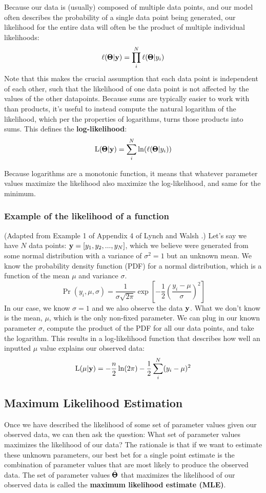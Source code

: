 \documentclass[12pt]{article}
\begin{document}
Because our data is (usually) composed of multiple data points, and our model often describes the probability of a single data point being generated, our likelihood for the entire data will often be the product of multiple individual likelihoods:
$$ \ell(\pmb{\Theta} | \mathbf{y}) = \prod_i^{N} \ell(\pmb{\Theta} | y_i) $$
Note that this makes the crucial assumption that each data point is independent of each other, such that the likelihood of one data point is not affected by the values of the other datapoints.
Because sums are typically easier to work with than products, it's useful to instead compute the natural logarithm of the likelihood, which per the properties of logarithms, turns those products into sums.
This defines the \textbf{log-likelihood}:
$$ \mathrm{L}(\pmb{\Theta} | \mathbf{y}) = \sum_i^{N} \ln( \ell(\pmb{\Theta} | y_i) ) $$

Because logarithms are a monotonic function, it means that whatever parameter values maximize the likelihood also maximize the log-likelihood, and same for the minimum.

\subsubsection{Example of the likelihood of a function}
(Adapted from Example 1 of Appendix 4 of Lynch and Walsh \citep{lynch1998book}.)
Let's say we have $N$ data points: $\mathbf{y} = [y_1,y_2, ..., y_N]$, which we believe were generated from some normal distribution with a variance of $\sigma^2 = 1$ but an unknown mean.
We know the probability density function (PDF) for a normal distribution, which is a function of the mean $\mu$ and variance $\sigma$.
$$
\Pr(y_i, \mu, \sigma) = 
\frac{1}{\sigma \sqrt{2 \pi}}
\exp[- \frac{1}{2} (
    \frac{y_i - \mu}{\sigma}
    )^2]
$$
In our case, we know $\sigma = 1$ and we also observe the data $\mathbf{y}$.
What we don't know is the mean, $\mu$, which is the only non-fixed parameter.
We can plug in our known parameter $\sigma$, compute the product of the PDF for all our data points, and take the logarithm.
This results in a log-likelihood function that describes how well an inputted $\mu$ value explains our observed data:
$$
\mathrm{L}(\mu | \mathbf{y}) = - \frac{n}{2} \ln(2 \pi) -
\frac{1}{2} \sum_i^{N} (y_i - \mu)^2
$$

\subsection{Maximum Likelihood Estimation}
Once we have described the likelihood of some set of parameter values given our observed data, we can then ask the question:
What set of parameter values maximizes the likelihood of our data?
The rationale is that if we want to estimate these unknown parameters, our best bet for a single point estimate is the combination of parameter values that are most likely to produce the observed data.
The set of parameter values $\hat{\pmb{\Theta}}$ that maximizes the likelihood of our observed data is called the \textbf{maximum likelihood estimate (MLE)}.
\end{document}
